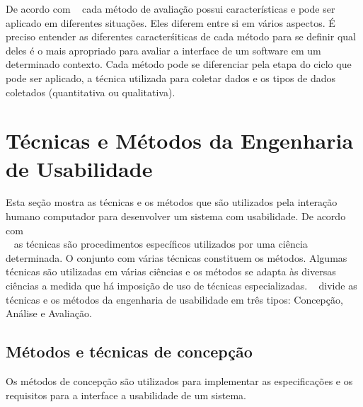 De acordo com ~ cada método de avaliação possui características e pode ser aplicado em diferentes situações.
%
Eles diferem entre si em vários aspectos. É preciso entender as diferentes caracterśiticas de cada método para se definir qual deles é o mais apropriado para avaliar a interface de um software em um determinado contexto.
%
Cada método pode se diferenciar pela etapa do ciclo que pode ser aplicado, a técnica utilizada para coletar dados e os tipos de dados coletados (quantitativa ou qualitativa). 


\section{Técnicas e Métodos da Engenharia de Usabilidade}

Esta seção mostra as técnicas e os métodos que são utilizados pela interação humano computador para desenvolver um sistema com usabilidade.
%
De acordo com \\ ~ as técnicas são procedimentos específicos utilizados por uma ciência determinada. O conjunto com várias técnicas constituem os métodos. Algumas técnicas são utilizadas em várias ciências e os métodos se adapta às diversas ciências a medida que há imposição de uso de técnicas especializadas.
%
~ divide as técnicas e os métodos da engenharia de usabilidade em três tipos: Concepção, Análise e Avaliação.


\subsection{Métodos e técnicas de concepção}

	Os métodos de concepção são utilizados para implementar as especificações e os requisitos para a interface a usabilidade de um sistema.

